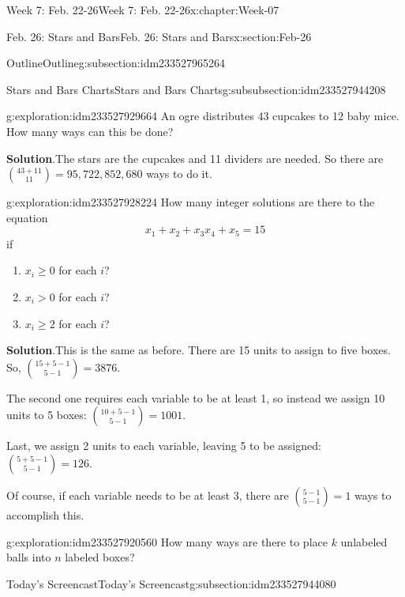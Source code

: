 \documentclass[oneside,10pt,]{book}
\newcommand{\blocktitlefont}{\relax}
\numberwithin{equation}{section}
\renewcommand{\ge}{\geqslant}
\newcommand{\gt}{>}
\begin{document}
\begin{chapterptx}{Week 7: Feb. 22-26}{}{Week 7: Feb. 22-26}{}{}{x:chapter:Week-07}
\begin{sectionptx}{Feb. 26: Stars and Bars}{}{Feb. 26: Stars and Bars}{}{}{x:section:Feb-26}
\begin{subsectionptx}{Outline}{}{Outline}{}{}{g:subsection:idm233527965264}
\begin{subsubsectionptx}{Stars and Bars Charts}{}{Stars and Bars Charts}{}{}{g:subsubsection:idm233527944208}
\begin{exploration}{}{g:exploration:idm233527929664}%
An ogre distributes 43 cupcakes to 12 baby mice. How many ways can this be done?%
\par\smallskip%
\noindent\textbf{\blocktitlefont Solution}.\hypertarget{g:solution:idm233527928992}{}\quad{}The stars are the cupcakes and 11 dividers are needed. So there are \(\binom{43+11}{11} = 95,722,852,680\) ways to do it.\end{exploration}%
\begin{exploration}{}{g:exploration:idm233527928224}%
How many integer solutions are there to the equation%
%
\begin{equation*}
x_1 + x_2 + x_3  x_4 + x_5 = 15
\end{equation*}
if %
\begin{enumerate}
\item{}\(x_i \ge 0\) for each \(i\)?%
\item{}\(x_i \gt 0\) for each \(i\)?%
\item{}\(x_i \ge 2\) for each \(i\)?%
\end{enumerate}
\par\smallskip%
\noindent\textbf{\blocktitlefont Solution}.\hypertarget{g:solution:idm233527923840}{}\quad{}This is the same as before. There are 15 units to assign to five boxes. So, \(\binom{15+5-1}{5-1} = 3876\).%
\par
The second one requires each variable to be at least 1, so instead we assign 10 units to 5 boxes: \(\binom{10+5-1}{5-1} = 1001\).%
\par
Last, we assign 2 units to each variable, leaving 5 to be assigned: \(\binom{5+5-1}{5-1} = 126\).%
\par
Of course, if each variable needs to be at least 3, there are \(\binom{5-1}{5-1} = 1\) ways to accomplish this.%
\end{exploration}%
\begin{exploration}{}{g:exploration:idm233527920560}%
How many ways are there to place \(k\) unlabeled balls into \(n\) labeled boxes?%
\end{exploration}%
\end{subsubsectionptx}
\end{subsectionptx}
%
%
\typeout{************************************************}
\typeout{************************************************}
%
\begin{subsectionptx}{Today's Screencast}{}{Today's Screencast}{}{}{g:subsection:idm233527944080}

\end{subsectionptx}
\end{sectionptx}
\end{chapterptx}
\end{document}
